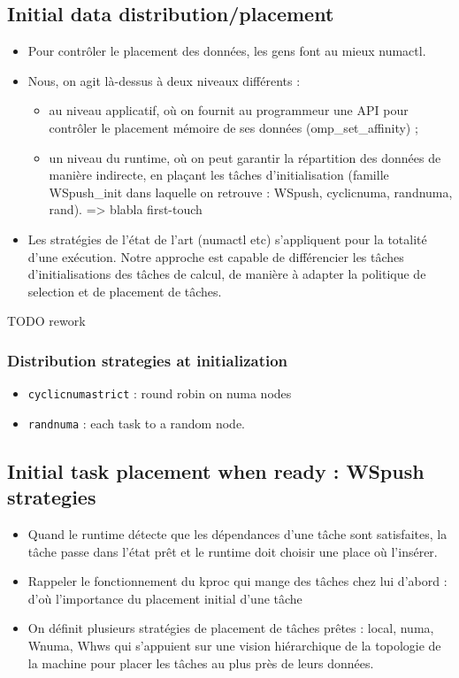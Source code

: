\documentclass{Styles/llncs}
\begin{document}
\subsection{Initial data distribution/placement}
\begin{itemize}
  \item Pour contrôler le placement des données, les gens font au
    mieux numactl.
  \item Nous, on agit là-dessus à deux niveaux différents :
    \begin{itemize}
      \item au niveau applicatif, où on fournit au programmeur une API
        pour contrôler le placement mémoire de ses données
        (omp\_set\_affinity) ;
      \item un niveau du runtime, où on peut garantir la
        répartition des données de manière indirecte, en plaçant les
        tâches d'initialisation (famille WSpush\_init dans laquelle on
        retrouve : WSpush, cyclicnuma, randnuma, rand). => blabla first-touch
      \end{itemize}
    \item Les stratégies de l'état de l'art (numactl etc) s'appliquent
      pour la totalité d'une exécution. Notre approche est capable de
      différencier les tâches d'initialisations des tâches de calcul,
      de manière à adapter la politique de selection et de placement
      de tâches.
\end{itemize}

TODO rework
\subsubsection{Distribution strategies at initialization}
\begin{itemize}
  \item \verb/cyclicnumastrict/ : round robin on numa nodes
  \item \verb/randnuma/ : each task to a random node.
\end{itemize}

\subsection{Initial task placement when ready : WSpush strategies}
\begin{itemize}
  \item Quand le runtime détecte que les dépendances d'une tâche sont
    satisfaites, la tâche passe dans l'état prêt et le runtime doit
    choisir une place où l'insérer.
  \item Rappeler le fonctionnement du kproc qui mange des tâches chez
    lui d'abord : d'où l'importance du placement initial d'une tâche
  \item On définit plusieurs stratégies de placement de tâches prêtes
    : local, numa, Wnuma, Whws qui s'appuient sur une vision hiérarchique de
    la topologie de la machine pour placer les tâches au plus près de
    leurs données.
\end{itemize}
\end{document}
